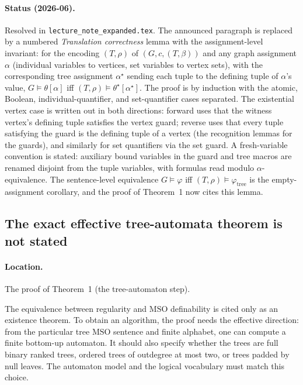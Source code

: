 \documentclass[11pt]{article}
\newcommand{\MSO}{\ensuremath{\mathrm{MSO}}}
\begin{document}
\paragraph{Status (2026-06).} Resolved in \texttt{lecture\_note\_expanded.tex}.
The announced paragraph is replaced by a numbered \emph{Translation correctness}
lemma with the assignment-level invariant: for the encoding \((T,\rho)\) of
\((G,c,(T,\beta))\) and any graph assignment \(\alpha\) (individual variables to
vertices, set variables to vertex sets), with the corresponding tree assignment
\(\alpha^\star\) sending each tuple to the defining tuple of \(\alpha\)'s value,
\(G\models\theta[\alpha]\) iff \((T,\rho)\models\theta^\star[\alpha^\star]\).  The
proof is by induction with the atomic, Boolean, individual-quantifier, and
set-quantifier cases separated.  The existential vertex case is written out in
both directions: forward uses that the witness vertex's defining tuple satisfies
the vertex guard; reverse uses that every tuple satisfying the guard is the
defining tuple of a vertex (the recognition lemmas for the guards), and similarly
for set quantifiers via the set guard.  A fresh-variable convention is stated:
auxiliary bound variables in the guard and tree macros are renamed disjoint from
the tuple variables, with formulas read modulo \(\alpha\)-equivalence.  The
sentence-level equivalence \(G\models\varphi\) iff
\((T,\rho)\models\varphi_{\mathrm{tree}}\) is the empty-assignment corollary, and
the proof of Theorem~1 now cites this lemma.

\subsection{The exact effective tree-automata theorem is not stated}

\paragraph{Location.} The proof of Theorem~1 (the tree-automaton step).

The equivalence between regularity and \MSO{} definability is cited only as an
existence theorem.  To obtain an algorithm, the proof needs the effective
direction: from the particular tree \MSO{} sentence and finite alphabet, one
can compute a finite bottom-up automaton.  It should also specify whether the
trees are full binary ranked trees, ordered trees of outdegree at most two, or
trees padded by null leaves.  The automaton model and the logical vocabulary
must match this choice.
\end{document}
